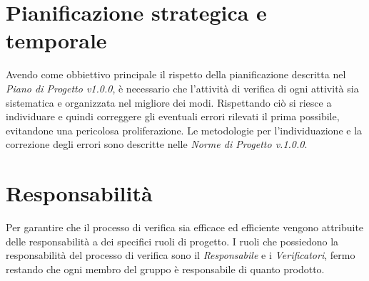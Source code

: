 \section{Pianificazione strategica e temporale}
Avendo come obbiettivo principale il rispetto della pianificazione descritta nel \textit{Piano di Progetto v1.0.0}, è necessario che l'attività di verifica di ogni attività sia sistematica e organizzata nel migliore dei modi. 
Rispettando ciò si riesce a individuare e quindi correggere gli eventuali errori rilevati il prima possibile, evitandone una pericolosa proliferazione. 
Le metodologie per l'individuazione e la correzione degli errori sono descritte nelle \textit{Norme di Progetto v.1.0.0}.
\section{Responsabilità}
Per garantire che il processo di verifica sia efficace ed efficiente vengono attribuite delle responsabilità a dei specifici ruoli di progetto.
I ruoli che possiedono la responsabilità del processo di verifica sono il \textit{Responsabile} e i \textit{Verificatori}, fermo restando che ogni membro del gruppo è responsabile di quanto prodotto.
